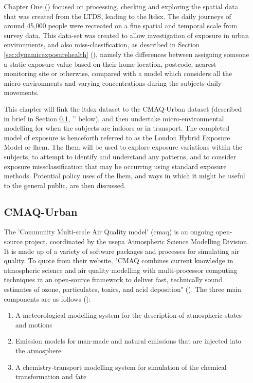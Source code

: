 Chapter One () focused on processing, checking and exploring the spatial data that was created from the LTDS, leading to the \gls{ltdsx}. The daily journeys of around 45,000 people were recreated on a fine spatial and temporal scale from survey data. This data-set was created to allow investigation of exposure in urban environments, and also miss-classification, as described in Section \ref{sec:dynamicexposurehealth} (), namely the differences between assigning someone a static exposure value based on their home location, postcode, nearest monitoring site or otherwise, compared with a model which considers all the micro-environments and varying concentrations during the subjects daily movements.

This chapter will link the \gls{ltdsx} dataset to the CMAQ-Urban dataset (described in brief in Section \ref{subsec:cmaq_urban}, '' below), and then undertake micro-environmental modelling for when the subjects are indoors or in transport. The completed model of exposure is henceforth referred to as the London Hybrid Exposure Model or \gls{lhem}. The \gls{lhem} will be used to explore exposure variations within the subjects, to attempt to identify and understand any patterns, and to consider exposure missclassification that may be occurring using standard exposure methods. Potential policy uses of the \gls{lhem}, and ways in which it might be useful to the general public, are then discussed.

\subsection{CMAQ-Urban}
\label{subsec:cmaq_urban}

The 'Community Multi-scale Air Quality model' (\gls{cmaq}) is an ongoing open-source project, coordinated by the \gls{usepa} Atmospheric Science Modelling Division. It is made up of a variety of software packages and processes for simulating air quality. To quote from their website, "CMAQ combines current knowledge in atmospheric science and air quality modelling with multi-processor computing techniques in an open-source framework to deliver fast, technically sound estimates of ozone, particulates, toxics, and acid deposition" (\cite{UnitedStatesEnvironmentalProtectionAgency2014}). The three main components are as follows (\cite{CMASCentre}):

\begin{enumerate}
\item A meteorological modelling system for the description of atmospheric states and motions
\item Emission models for man-made and natural emissions that are injected into the atmosphere
\item A chemistry-transport modelling system for simulation of the chemical transformation and fate
\end{enumerate}

